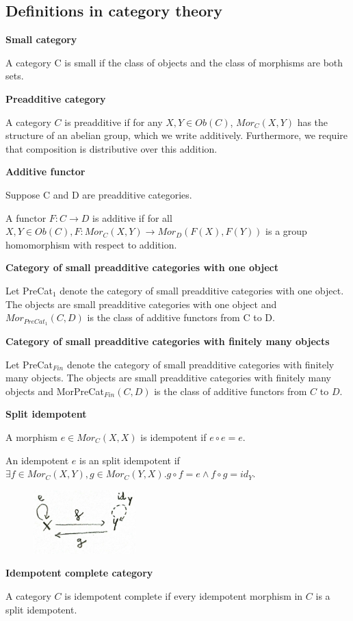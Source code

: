 \subsection{Definitions in category theory}

\begin{definition}

\textbf{Small category}

A category C is small if the class of objects and the class of morphisms are both sets.

\textbf{Preadditive category}

A category $C$ is preadditive if for any $X,Y \in Ob(C)$, $Mor_C(X,Y)$ has the structure of an abelian group, which we write additively. Furthermore, we require that composition is distributive over this addition.

\textbf{Additive functor}

Suppose C and D are preadditive categories. 

A functor $F : C \to D$ is additive if for all $X, Y \in Ob(C), F : Mor_C(X, Y ) \to Mor_D(F (X), F (Y ))$ is a group homomorphism with respect to addition.

\textbf{Category of small preadditive categories with one object}

Let PreCat$_1$ denote the category of small preadditive categories with one object. The objects are small preadditive categories with one object and $Mor_{PreCat_1}(C, D)$ is the class of additive functors from C to D.

\textbf{Category of small preadditive categories with finitely many objects}

Let PreCat$_{Fin}$ denote the category of small preadditive categories with finitely many objects. The objects are small preadditive categories with finitely many objects and MorPreCat$_{Fin}(C, D)$ is the class of additive functors from $C$ to $D$.

\textbf{Split idempotent}

A morphism $e \in Mor_C(X,X)$ is idempotent if $e \circ e = e$.

An idempotent $e$ is an split idempotent if $\exists f \in Mor_C(X,Y), g \in Mor_C(Y,X).g \circ f = e \land f \circ g = id_Y$.


\begin{figure}[H]
\centering
\includegraphics[width=4cm]{images/idempotent.jpg}
\end{figure}

\textbf{Idempotent complete category}

A category $C$ is idempotent complete if every idempotent morphism in $C$ is a split idempotent.
\end{definition}

